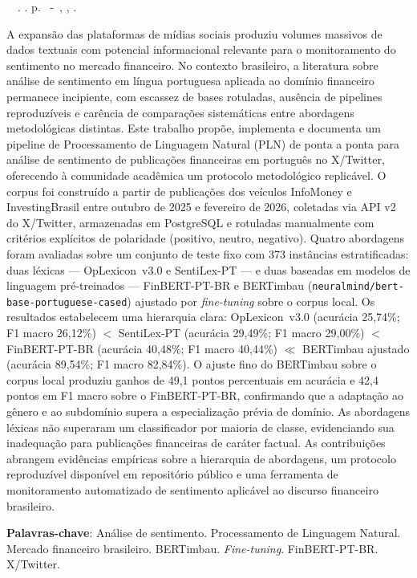 \setlength{\absparsep}{18pt} %
\begin{resumo}
	\begin{flushleft} 
			\setlength{\absparsep}{0pt} %
			\SingleSpacing 
			\imprimirautorabr~~\textbf{\imprimirtituloresumo}.	\imprimirdata. \pageref{LastPage} p. 
			\imprimirtipotrabalho~-~\imprimirinstituicao, \imprimirlocal, \imprimirdata. 
 	\end{flushleft}
	
	\OnehalfSpacing 
	
	A expansão das plataformas de mídias sociais produziu volumes massivos de dados textuais com potencial informacional relevante para o monitoramento do sentimento no mercado financeiro. No contexto brasileiro, a literatura sobre análise de sentimento em língua portuguesa aplicada ao domínio financeiro permanece incipiente, com escassez de bases rotuladas, ausência de pipelines reproduzíveis e carência de comparações sistemáticas entre abordagens metodológicas distintas. Este trabalho propõe, implementa e documenta um pipeline de Processamento de Linguagem Natural (PLN) de ponta a ponta para análise de sentimento de publicações financeiras em português no X/Twitter, oferecendo à comunidade acadêmica um protocolo metodológico replicável. O corpus foi construído a partir de publicações dos veículos InfoMoney e InvestingBrasil entre outubro de 2025 e fevereiro de 2026, coletadas via API v2 do X/Twitter, armazenadas em PostgreSQL e rotuladas manualmente com critérios explícitos de polaridade (positivo, neutro, negativo). Quatro abordagens foram avaliadas sobre um conjunto de teste fixo com 373 instâncias estratificadas: duas léxicas --- OpLexicon~v3.0 e SentiLex-PT --- e duas baseadas em modelos de linguagem pré-treinados --- FinBERT-PT-BR e BERTimbau (\texttt{neuralmind/bert-base-portuguese-cased}) ajustado por \textit{fine-tuning} sobre o corpus local. Os resultados estabelecem uma hierarquia clara: OpLexicon~v3.0 (acurácia 25,74\%; F1 macro 26,12\%) $<$ SentiLex-PT (acurácia 29,49\%; F1 macro 29,00\%) $<$ FinBERT-PT-BR (acurácia 40,48\%; F1 macro 40,44\%) $\ll$ BERTimbau ajustado (acurácia 89,54\%; F1 macro 82,84\%). O ajuste fino do BERTimbau sobre o corpus local produziu ganhos de 49,1 pontos percentuais em acurácia e 42,4 pontos em F1 macro sobre o FinBERT-PT-BR, confirmando que a adaptação ao gênero e ao subdomínio supera a especialização prévia de domínio. As abordagens léxicas não superaram um classificador por maioria de classe, evidenciando sua inadequação para publicações financeiras de caráter factual. As contribuições abrangem evidências empíricas sobre a hierarquia de abordagens, um protocolo reproduzível disponível em repositório público e uma ferramenta de monitoramento automatizado de sentimento aplicável ao discurso financeiro brasileiro.


	\textbf{Palavras-chave}: Análise de sentimento. Processamento de Linguagem Natural. Mercado financeiro brasileiro. BERTimbau. \textit{Fine-tuning}. FinBERT-PT-BR. X/Twitter.
\end{resumo}